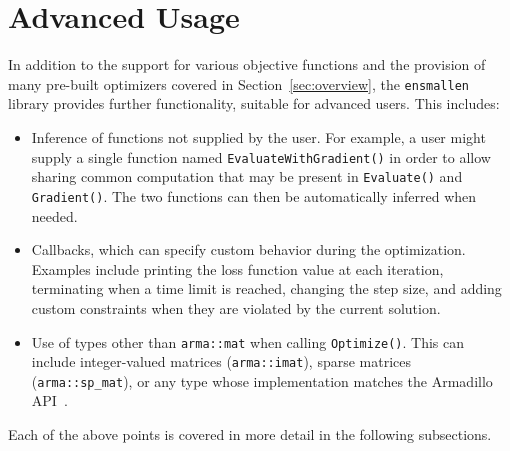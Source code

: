 \section{Advanced Usage}
\label{sec:advanced}

In addition to the support for various objective functions and
the provision of many pre-built optimizers covered in Section~\ref{sec:overview},
the {\tt ensmallen} library provides further functionality, suitable for advanced users.
This includes:

\begin{itemize}

\item
Inference of functions not supplied by the user.
For example, a user might supply a single function named
{\tt EvaluateWithGradient()}
in order to allow sharing common computation that may be 
present in {\tt Evaluate()} and {\tt Gradient()}.
The two functions can then be automatically inferred when needed.

\item
Callbacks, which can specify custom behavior during the optimization.
Examples include printing the loss function value at each iteration,
terminating when a time limit is reached,
changing the step size,
and adding custom constraints when they are violated by the current solution.

\item
Use of types other than {\tt arma::mat} when calling {\tt Optimize()}.
This can include
integer-valued matrices ({\tt arma::imat}),
sparse matrices ({\tt arma::sp\_mat}),
or any type whose implementation matches the Armadillo API~\cite{sanderson2016armadillo,sanderson2018user}.

\end{itemize}

Each of the above points is covered in more detail in the following subsections.
